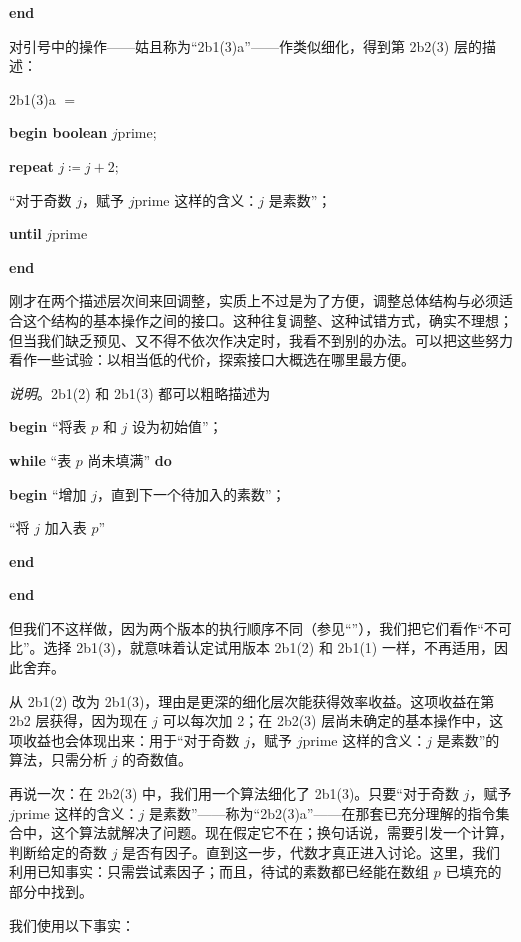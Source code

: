 \noindent
\textbf{end}

\noindent
对引号中的操作——姑且称为“2b1(3)a”——作类似细化，得到第 2b2(3) 层的描述：

\noindent
2b1(3)a $=$

\noindent
\textbf{begin boolean} $j$prime;

\noindent
\quad\textbf{repeat} $j \coloneq j + 2;$

\noindent
\quad\quad“对于奇数 $j$，赋予 $j$prime 这样的含义：$j$ 是素数”；

\noindent
\quad\textbf{until} $j$prime

\noindent
\textbf{end}

刚才在两个描述层次间来回调整，实质上不过是为了方便，调整总体结构与必须适合这个结构的基本操作之间的接口。这种往复调整、这种试错方式，确实不理想；但当我们缺乏预见、又不得不依次作决定时，我看不到别的办法。可以把这些努力看作一些试验：以相当低的代价，探索接口大概选在哪里最方便。

\noindent
\textit{说明}。2b1(2) 和 2b1(3) 都可以粗略描述为

\noindent
\textbf{begin} “将表 $p$ 和 $j$ 设为初始值”；

\noindent
\quad\textbf{while} “表 $p$ 尚未填满” \textbf{do}

\noindent
\quad\textbf{begin} “增加 $j$，直到下一个待加入的素数”；

\noindent
\quad\quad “将 $j$ 加入表 $p$”

\noindent
\quad\textbf{end}

\noindent
\textbf{end}

\noindent
但我们不这样做，因为两个版本的执行顺序不同（参见“”），我们把它们看作“不可比”。选择 2b1(3)，就意味着认定试用版本 2b1(2) 和 2b1(1) 一样，不再适用，因此舍弃。

从 2b1(2) 改为 2b1(3)，理由是更深的细化层次能获得效率收益。这项收益在第 2b2 层获得，因为现在 $j$ 可以每次加 2；在 2b2(3) 层尚未确定的基本操作中，这项收益也会体现出来：用于“对于奇数 $j$，赋予 $j$prime 这样的含义：$j$ 是素数”的算法，只需分析 $j$ 的奇数值。

再说一次：在 2b2(3) 中，我们用一个算法细化了 2b1(3)。只要“对于奇数 $j$，赋予 $j$prime 这样的含义：$j$ 是素数”——称为“2b2(3)a”——在那套已充分理解的指令集合中，这个算法就解决了问题。现在假定它不在；换句话说，需要引发一个计算，判断给定的奇数 $j$ 是否有因子。直到这一步，代数才真正进入讨论。这里，我们利用已知事实：只需尝试素因子；而且，待试的素数都已经能在数组 $p$ 已填充的部分中找到。

我们使用以下事实：

